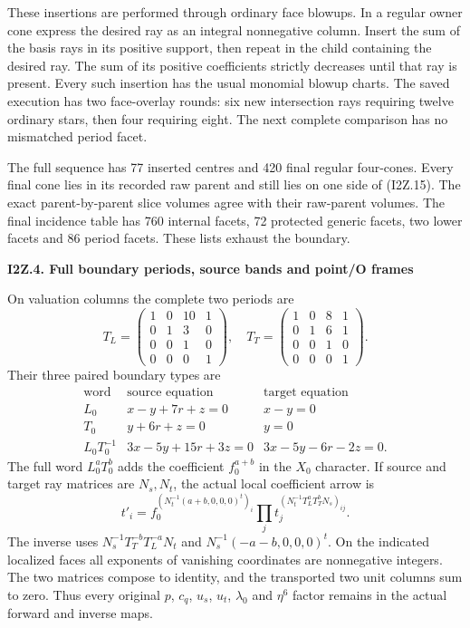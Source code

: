 These insertions are performed through ordinary face blowups. In a
regular owner cone express the desired ray as an integral nonnegative
column. Insert the sum of the basis rays in its positive support,
then repeat in the child containing the desired ray. The sum of its
positive coefficients strictly decreases until that ray is present.
Every such insertion has the usual monomial blowup charts. The saved
execution has two face-overlay rounds: six new intersection rays
requiring twelve ordinary stars, then four requiring eight. The next
complete comparison has no mismatched period facet.

The full sequence has 77 inserted centres and 420 final regular
four-cones. Every final cone lies in its recorded raw parent and
still lies on one side of (I2Z.15). The exact parent-by-parent slice
volumes agree with their raw-parent volumes. The final incidence
table has 760 internal facets, 72 protected generic facets, two lower
facets and 86 period facets. These lists exhaust the boundary.

\par

\medskip\noindent\textbf{I2Z.4. Full boundary periods, source bands and point/O frames}

\par\nobreak

On valuation columns the complete two periods are
\[
 T_L=\begin{pmatrix}1&0&10&1\\0&1&3&0\\0&0&1&0\\0&0&0&1\end{pmatrix},
 \quad
 T_T=\begin{pmatrix}1&0&8&1\\0&1&6&1\\0&0&1&0\\0&0&0&1\end{pmatrix}.
 \tag{I2Z.16}
\]
Their three paired boundary types are
\[
\begin{array}{c|c|c}
\text{word}&\text{source equation}&\text{target equation}\\ \hline
L_0&x-y+7r+z=0&x-y=0\\
T_0&y+6r+z=0&y=0\\
L_0T_0^{-1}&3x-5y+15r+3z=0&3x-5y-6r-2z=0 .
\end{array}
\tag{I2Z.17}
\]
The full word \(L_0^aT_0^b\) adds the coefficient \(f_0^{a+b}\)
in the \(X_0\) character. If source and target ray matrices are
\(N_s,N_t\), the actual local coefficient arrow is
\[
 t'_i=f_0^{(N_t^{-1}(a+b,0,0,0)^t)_i}
       \prod_jt_j^{(N_t^{-1}T_L^aT_T^bN_s)_{ij}}.
 \tag{I2Z.18}
\]
The inverse uses \(N_s^{-1}T_T^{-b}T_L^{-a}N_t\) and
\(N_s^{-1}(-a-b,0,0,0)^t\). On the indicated localized faces all
exponents of vanishing coordinates are nonnegative integers. The
two matrices compose to identity, and the transported two unit
columns sum to zero. Thus every original \(p\), \(c_q\), \(u_s\),
\(u_t\), \(\lambda_0\) and \(\eta^6\) factor remains in the actual
forward and inverse maps.

